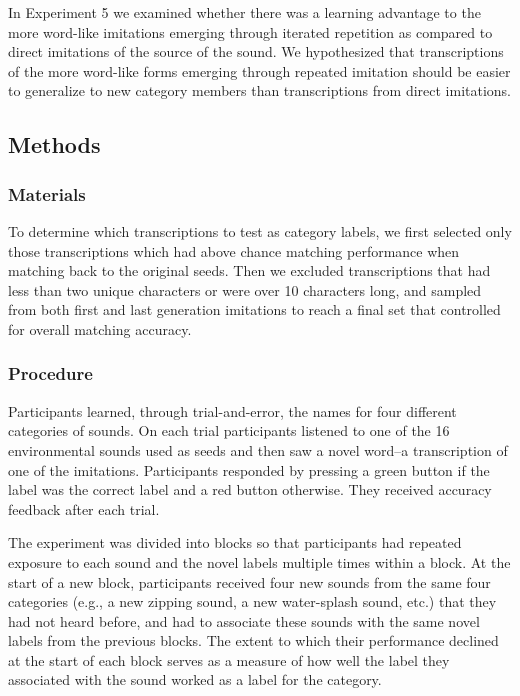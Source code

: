 \documentclass[10pt,letterpaper]{article}
\begin{document}
In Experiment 5 we examined whether there was a learning advantage to
the more word-like imitations emerging through iterated repetition as
compared to direct imitations of the source of the sound. We
hypothesized that transcriptions of the more word-like forms emerging
through repeated imitation should be easier to generalize to new
category members than transcriptions from direct imitations.

\subsection{Methods}\label{methods-4}

\subsubsection{Materials}\label{materials-4}

To determine which transcriptions to test as category labels, we first
selected only those transcriptions which had above chance matching
performance when matching back to the original seeds. Then we excluded
transcriptions that had less than two unique characters or were over 10
characters long, and sampled from both first and last generation
imitations to reach a final set that controlled for overall matching
accuracy.

\subsubsection{Procedure}\label{procedure-4}

Participants learned, through trial-and-error, the names for four
different categories of sounds. On each trial participants listened to
one of the 16 environmental sounds used as seeds and then saw a novel
word--a transcription of one of the imitations. Participants responded
by pressing a green button if the label was the correct label and a red
button otherwise. They received accuracy feedback after each trial.

The experiment was divided into blocks so that participants had repeated
exposure to each sound and the novel labels multiple times within a
block. At the start of a new block, participants received four new
sounds from the same four categories (e.g., a new zipping sound, a new
water-splash sound, etc.) that they had not heard before, and had to
associate these sounds with the same novel labels from the previous
blocks. The extent to which their performance declined at the start of
each block serves as a measure of how well the label they associated
with the sound worked as a label for the category.
\end{document}
